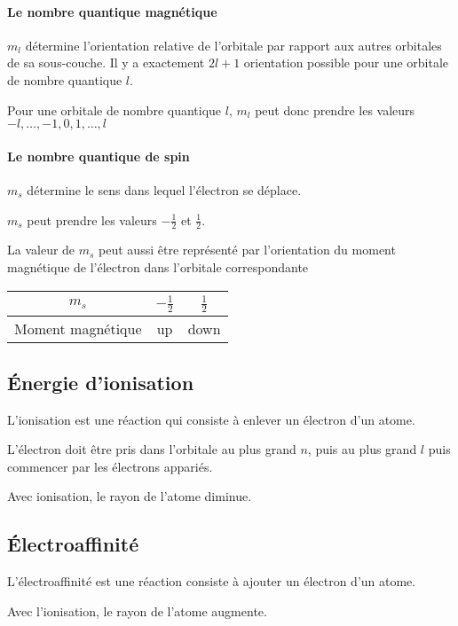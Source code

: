 \documentclass[11pt,a4paper,french]{article}
\begin{document}
\paragraph{Le nombre quantique magnétique}
$m_l$ détermine l'orientation relative de l'orbitale par rapport aux autres orbitales de sa sous-couche.
Il y a exactement $2l + 1$ orientation possible pour une orbitale de nombre quantique $l$.

Pour une orbitale de nombre quantique $l$, $m_l$ peut donc prendre les valeurs $-l, \ldots, -1,  0, 1, \ldots, l$

\paragraph{Le nombre quantique de spin}
$m_s$ détermine le sens dans lequel l'électron se déplace.

$m_s$ peut prendre les valeurs $-\frac{1}{2}$ et $\frac{1}{2}$.

La valeur de $m_s$ peut aussi être représenté par l'orientation du moment magnétique de l'électron dans l'orbitale correspondante

\begin{center}
	\begin{tabular}{c|cc}
		$m_s$ & $-\frac{1}{2}$ & $\frac{1}{2}$\\
		\hline
		Moment magnétique & up & down
	\end{tabular}
\end{center}


\subsection{\'Energie d'ionisation}
\label{sec:ioni}
L'ionisation est une réaction qui consiste à enlever un électron d'un atome.

L'électron doit être pris dans l'orbitale au plus grand $n$, puis au plus grand $l$ puis commencer par les électrons appariés.

Avec ionisation, le rayon de l'atome diminue.

\subsection{\'Electroaffinité}
\label{sec:electro}
L'électroaffinité est une réaction consiste à ajouter un électron d'un atome.

Avec l'ionisation, le rayon de l'atome augmente.
\end{document}
